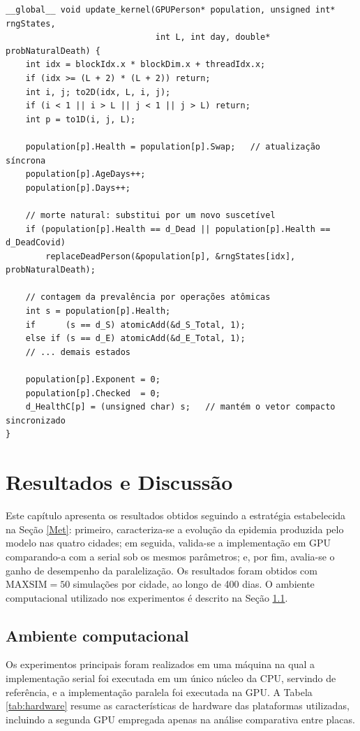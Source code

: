 \documentclass[
	12pt,				%
	openright,			%
	oneside,			%
	a4paper,			%
	english,			%
	french,				%
	spanish,			%
	brazil				%
	]{abntex2}
\begin{document}
\begin{lstlisting}[caption={Atualização síncrona, substituição e contagem por operações atômicas.}, label={lst:updatekernel}]
__global__ void update_kernel(GPUPerson* population, unsigned int* rngStates,
                              int L, int day, double* probNaturalDeath) {
    int idx = blockIdx.x * blockDim.x + threadIdx.x;
    if (idx >= (L + 2) * (L + 2)) return;
    int i, j; to2D(idx, L, i, j);
    if (i < 1 || i > L || j < 1 || j > L) return;
    int p = to1D(i, j, L);

    population[p].Health = population[p].Swap;   // atualização síncrona
    population[p].AgeDays++;
    population[p].Days++;

    // morte natural: substitui por um novo suscetível
    if (population[p].Health == d_Dead || population[p].Health == d_DeadCovid)
        replaceDeadPerson(&population[p], &rngStates[idx], probNaturalDeath);

    // contagem da prevalência por operações atômicas
    int s = population[p].Health;
    if      (s == d_S) atomicAdd(&d_S_Total, 1);
    else if (s == d_E) atomicAdd(&d_E_Total, 1);
    // ... demais estados

    population[p].Exponent = 0;
    population[p].Checked  = 0;
    d_HealthC[p] = (unsigned char) s;   // mantém o vetor compacto sincronizado
}
\end{lstlisting}

\chapter{Resultados e Discussão}
\label{cap:resultados}

Este capítulo apresenta os resultados obtidos seguindo a estratégia estabelecida na Seção \ref{Met}: primeiro, caracteriza-se a evolução da epidemia produzida pelo modelo nas quatro cidades; em seguida, valida-se a implementação em GPU comparando-a com a serial sob os mesmos parâmetros; e, por fim, avalia-se o ganho de desempenho da paralelização. Os resultados foram obtidos com $\text{MAXSIM} = 50$ simulações por cidade, ao longo de 400 dias. O ambiente computacional utilizado nos experimentos é descrito na Seção \ref{sec:ambiente}.

\section{Ambiente computacional}
\label{sec:ambiente}

Os experimentos principais foram realizados em uma máquina na qual a implementação serial foi executada em um único núcleo da CPU, servindo de referência, e a implementação paralela foi executada na GPU. A Tabela \ref{tab:hardware} resume as características de hardware das plataformas utilizadas, incluindo a segunda GPU empregada apenas na análise comparativa entre placas.
\end{document}
